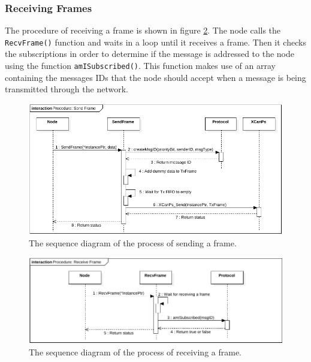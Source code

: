 \subsubsection*{Receiving Frames}
The procedure of receiving a frame is shown in figure \ref{fig:SeqDiagram_RecvFrame}.
The node calls the \texttt{RecvFrame()} function and waits in a loop until it receives a frame.
Then it checks the subscriptions in order to determine if the message is addressed to the node using the function \texttt{amISubscribed()}.
This function makes use of an array containing the messages IDs that the node should accept when a message is being transmitted through the network.
\begin{figure}[h!]
	\centering
	\includegraphics[width = 1\linewidth]{graphics/SeqDiagram_SendFrame.pdf}
	\caption{The sequence diagram of the process of sending a frame.}
	\label{fig:SeqDiagram_SendFrame}
\end{figure}

\begin{figure}[h!]
	\centering
	\includegraphics[width = 1\linewidth]{graphics/SeqDiagram_RecvFrame.pdf}
	\caption{The sequence diagram of the process of receiving a frame.}
	\label{fig:SeqDiagram_RecvFrame}
\end{figure}
